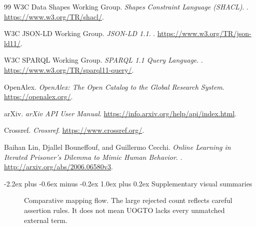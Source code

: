 \documentclass[11pt]{article}
\makeatletter
\renewcommand\section{\@startsection{section}{1}{\z@}%
  {-2.2ex plus -0.6ex minus -0.2ex}%
  {1.0ex plus 0.2ex}%
  {\normalfont\Large\bfseries\color{uogtoInk}}}
\makeatother
\begin{document}
\begin{thebibliography}{99}
W3C Data Shapes Working Group.
\newblock \emph{Shapes Constraint Language (SHACL)}.
. \url{https://www.w3.org/TR/shacl/}.

W3C JSON-LD Working Group.
\newblock \emph{JSON-LD 1.1}.
. \url{https://www.w3.org/TR/json-ld11/}.

W3C SPARQL Working Group.
\newblock \emph{SPARQL 1.1 Query Language}.
. \url{https://www.w3.org/TR/sparql11-query/}.

OpenAlex.
\newblock \emph{OpenAlex: The Open Catalog to the Global Research System}.
\newblock \url{https://openalex.org/}.

arXiv.
\newblock \emph{arXiv API User Manual}.
\newblock \url{https://info.arxiv.org/help/api/index.html}.

Crossref.
\newblock \emph{Crossref}.
\newblock \url{https://www.crossref.org/}.

Baihan Lin, Djallel Bouneffouf, and Guillermo Cecchi.
\newblock \emph{Online Learning in Iterated Prisoner's Dilemma to Mimic Human Behavior}.
. \url{http://arxiv.org/abs/2006.06580v3}.

\end{thebibliography}

\clearpage
\appendix
\setcounter{figure}{0}
\renewcommand{\thefigure}{A\arabic{figure}}
\renewcommand{\theHfigure}{appendix.A\arabic{figure}}
\section{Supplementary visual summaries}

\begin{figure}[!htbp]
\centering
{}
\caption{Comparative mapping flow. The large rejected count reflects careful assertion rules. It does not mean UOGTO lacks every unmatched external term.}
\label{fig:mapping-flow-summary}
\end{figure}
\end{document}
